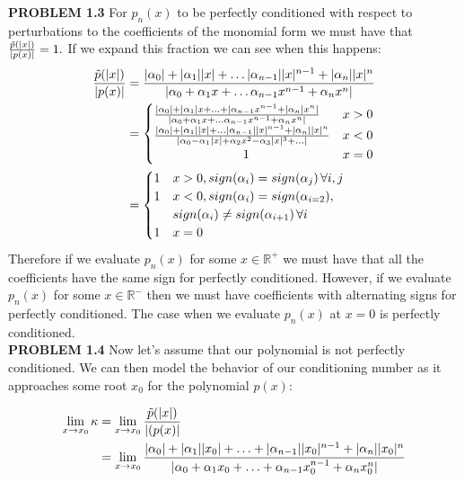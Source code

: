 \documentclass[12pt]{article}
\DeclarePairedDelimiter \abs{\lvert}{\rvert}%
\theoremstyle{remark}
\begin{document}
\textbf{PROBLEM 1.3} For $p_n(x)$ to be perfectly conditioned with respect to perturbations to the coefficients of the monomial form we must have that $\frac{\tilde{p}(\abs{x})}{\abs{p(x)}} = 1.$ If we expand this fraction we can see when this happens:
\begin{align*}
	\frac{\tilde{p}(\abs{x})}{\abs{p(x)}} & = \frac{{\abs{\alpha_0} + \abs{\alpha_1}\abs{x} + \ldots \abs{\alpha_{n-1}}\abs{x}^{n-1} + \abs{\alpha_n}\abs{x}^n}}{\abs{\alpha_0 + \alpha_1x + \ldots \alpha_{n-1}x^{n-1} + \alpha_nx^n}} \\
	& = 
	\begin{cases}
		\frac{\abs{\alpha_0} + \abs{\alpha_1}x + \ldots + \abs{\alpha_{n-1}x^{n-1} + \abs{\alpha_n}x^n}}{\abs{\alpha_0 + \alpha_1x + \ldots \alpha_{n-1}x^{n-1} + \alpha_nx^n}} & x > 0 \\
		\frac{{\abs{\alpha_0} + \abs{\alpha_1}\abs{x} + \ldots \abs{\alpha_{n-1}}\abs{x}^{n-1} + \abs{\alpha_n}\abs{x}^n}}{\abs{\alpha_0 - \alpha_1\abs{x} + \alpha_2x^2 - \alpha_3\abs{x}^3 + \ldots}} & x < 0 \\
		\hspace{2.5cm} 1 & x = 0
	\end{cases} \\
	& = 
	\begin{cases}
	1 & x > 0, sign(\alpha_i) = sign(\alpha_j) \, \forall i,j \\
	1 & x < 0, sign(\alpha_{i}) = sign(\alpha_{i=2}), \\ & sign(\alpha_i) \neq sign(\alpha_{i+1}) \, \forall i \\
	1 & x =0
	\end{cases}
\end{align*}
Therefore if we evaluate $p_n(x)$ for some $x \in \mathbb{R}^+$ we must have that all the coefficients have the same sign for perfectly conditioned. However, if we evaluate $p_n(x)$ for some $x \in \mathbb{R}^-$ then we must have coefficients with alternating signs for perfectly conditioned. The case when we evaluate $p_n(x)$ at $x = 0$ is perfectly conditioned. \\

\textbf{PROBLEM 1.4} Now let's assume that our polynomial is not perfectly conditioned. We can then model the behavior of our conditioning number as it approaches some root $x_0$ for the polynomial $p(x)$:

\begin{align*}
	\lim_{x \rightarrow x_0}\kappa & = \lim\limits_{x \rightarrow x_0} \frac{\tilde{p}(\abs{x})}{\abs{(p(x)}} \\
	& = \lim\limits_{x \rightarrow x_0} \frac{\abs{\alpha_0} + \abs{\alpha_1}\abs{x_0} + \ldots + \abs{\alpha_{n-1}}\abs{x_0}^{n-1} + \abs{\alpha_n}\abs{x_0}^n}{\abs{\alpha_0 + \alpha_1x_0 + \ldots + \alpha_{n-1}x_0^{n-1} + \alpha_nx_0^n}}
\end{align*}
\end{document}
